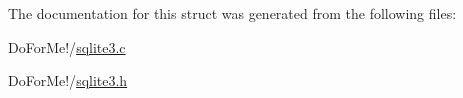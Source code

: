The documentation for this struct was generated from the following files\-:\begin{DoxyCompactItemize}
\item 
Do\-For\-Me!/\hyperlink{sqlite3_8c}{sqlite3.\-c}\item 
Do\-For\-Me!/\hyperlink{sqlite3_8h}{sqlite3.\-h}\end{DoxyCompactItemize}

